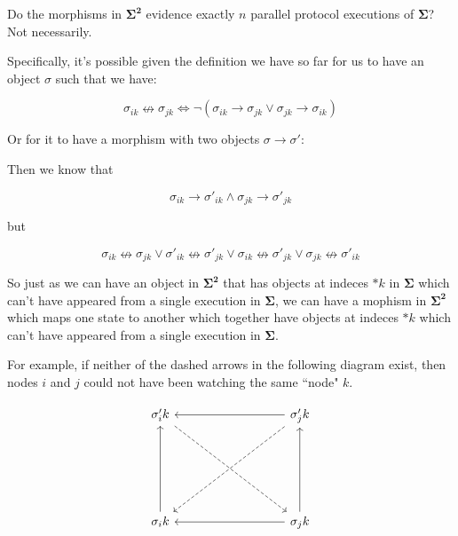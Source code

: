\documentclass{article}
\theoremstyle{definition}
\newcommand{\cat}{
	\mathbf
}
\begin{document}
Do the morphisms in $\cat{\Sigma^2}$ evidence exactly $n$ parallel protocol executions of $\cat{\Sigma}$? Not necessarily.

Specifically, it's possible given the definition we have so far for us to have an object $\sigma$ such that we have:

$$
\sigma_{ik} \nleftrightarrow \sigma_{jk} \iff \neg{(\sigma_{ik} \to \sigma_{jk} \lor \sigma_{jk} \to \sigma_{ik})}
$$

Or for it to have a morphism with two objects $\sigma \to \sigma'$:

Then we know that

$$
\sigma_{ik} \to \sigma'_{ik} \land \sigma_{jk} \to \sigma'_{jk}
$$

but

$$
\sigma_{ik} \nleftrightarrow \sigma_{jk} \lor \sigma'_{ik} \nleftrightarrow \sigma'_{jk} \lor \sigma_{ik} \nleftrightarrow \sigma'_{jk} \lor \sigma_{jk} \nleftrightarrow \sigma'_{ik}
$$

So just as we can have an object in $\cat{\Sigma^2}$ that has objects at indeces $*k$ in $\cat{\Sigma}$ which can't have appeared from a single execution in $\cat{\Sigma}$, we can have a mophism in $\cat{\Sigma^2}$ which maps one state to another which together have objects at indeces $*k$ which can't have appeared from a single execution in $\cat{\Sigma}$.

For example, if neither of the dashed arrows in the following diagram exist, then nodes $i$ and $j$ could not have been watching the same ``node" $k$.

\begin{equation*}
\begin{tikzcd}
\sigma'_ik
  \arrow[rrrddd,dashed]
  &
{}
  &
{}
  &
\sigma'_jk
  \arrow[lllddd,dashed]
  \arrow[lll,""]
  \\
{}
  &
{}
  &
{}%
  &
{}
  \\
{}
  &
{}
  &
{}%
  &
{}
  \\
\sigma_ik
  \arrow[uuu,""]
  &
{}
  &
{}%
  &
\sigma_jk
  \arrow[uuu,""]
  \arrow[lll,""]
\end{tikzcd}
\end{equation*}
\end{document}
